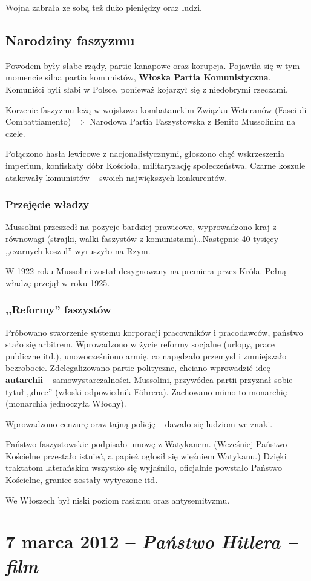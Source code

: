 \documentclass [a4paper, 11pt, oneside]{book}
\begin{document}
		Wojna zabrała ze sobą też dużo pieniędzy oraz ludzi.

	\subsection{Narodziny faszyzmu}
		Powodem były słabe rządy, partie kanapowe oraz korupcja. Pojawiła się w tym momencie silna partia komunistów, \textbf{Włoska Partia Komunistyczna}. Komuniści byli słabi w Polsce, ponieważ kojarzył się z niedobrymi rzeczami.

		Korzenie faszyzmu leżą w wojskowo-kombatanckim Związku Weteranów (Fasci di Combattiamento) $\Rightarrow$ Narodowa Partia Faszystowska z Benito Mussolinim na czele.

		Połączono hasła lewicowe z nacjonalistycznymi, głoszono chęć wskrzeszenia imperium, konfiskaty dóbr Kościoła, militaryzację społeczeństwa. Czarne koszule atakowały komunistów -- swoich największych konkurentów.

		\subsubsection{Przejęcie władzy}
			Mussolini przeszedł na pozycje bardziej prawicowe, wyprowadzono kraj z równowagi (strajki, walki faszystów z komunistami)\dots Następnie 40 tysięcy ,,czarnych koszul'' wyruszyło na Rzym.

			W 1922 roku Mussolini został desygnowany na premiera przez Króla. Pełną władzę przejął w roku 1925.
		\subsubsection{,,Reformy'' faszystów}
			Próbowano stworzenie systemu korporacji pracowników i pracodawców, państwo stało się arbitrem. Wprowadzono w życie reformy socjalne (urlopy, prace publiczne itd.), unowocześniono armię, co napędzało przemysł i zmniejszało bezrobocie. Zdelegalizowano partie polityczne, chciano wprowadzić ideę \textbf{autarchii} -- samowystarczalności. Mussolini, przywódca partii przyznał sobie tytuł ,,duce'' (włoski odpowiednik F\"{o}hrera). Zachowano mimo to monarchię (monarchia jednoczyła Włochy).

			Wprowadzono cenzurę oraz tajną policję -- dawało się ludziom we znaki.
			
			Państwo faszystowskie podpisało umowę z Watykanem. (Wcześniej Państwo Kościelne przestało istnieć, a papież ogłosił się więźniem Watykanu.) Dzięki traktatom laterańskim wszystko się wyjaśniło, oficjalnie powstało Państwo Kościelne, granice zostały wytyczone itd.

			We Włoszech był niski poziom rasizmu oraz antysemityzmu.
\section{7 marca 2012 -- \textit{Państwo Hitlera -- film}}
\end{document}
